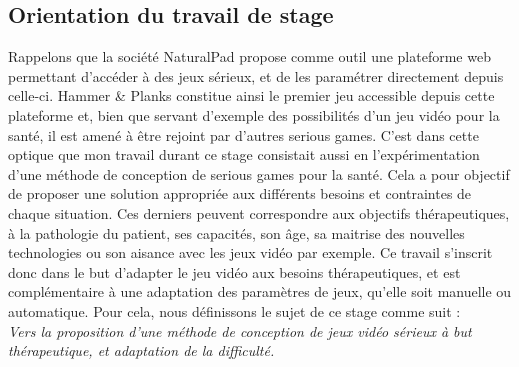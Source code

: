 \documentclass[french, 12pt]{article} %
\begin{document}
\subsection{Orientation du travail de stage}
Rappelons que la société NaturalPad propose comme outil une plateforme web permettant d'accéder à des jeux sérieux, et de les paramétrer directement depuis celle-ci. Hammer \& Planks constitue ainsi le premier jeu accessible depuis cette plateforme et, bien que servant d'exemple des possibilités d'un jeu vidéo pour la santé, il est amené à être rejoint par d'autres serious games. C'est dans cette optique que mon travail durant ce stage consistait aussi en l'expérimentation d'une méthode de conception de serious games pour la santé. Cela a pour objectif de proposer une solution appropriée aux différents besoins et contraintes de chaque situation. Ces derniers peuvent correspondre aux objectifs thérapeutiques, à la pathologie du patient, ses capacités, son âge, sa maitrise des nouvelles technologies ou son aisance avec les jeux vidéo par exemple. Ce travail s'inscrit donc  dans le but d'adapter le jeu vidéo aux besoins thérapeutiques, et est complémentaire à une adaptation des paramètres de jeux, qu'elle soit manuelle ou automatique. Pour cela, nous définissons le sujet de ce stage comme suit : \\
\emph{Vers la proposition d'une méthode de conception de jeux vidéo sérieux à but thérapeutique, et adaptation de la difficulté.}
	


%
%
%
%
%
%
%
%
%
%
%
%
%
%
\end{document}
